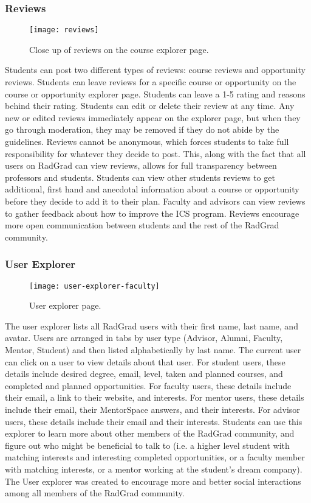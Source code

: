 \subsubsection{Reviews}
\begin{figure}[htbp!]
\centering
\texttt{[image: reviews]}
\caption{Close up of reviews on the course explorer page.}
\end{figure}
Students can post two different types of reviews: course reviews and opportunity reviews. Students can leave reviews for a specific course or opportunity on the course or opportunity explorer page. Students can leave a 1-5 rating and reasons behind their rating. Students can edit or delete their review at any time. Any new or edited reviews immediately appear on the explorer page, but when they go through moderation, they may be removed if they do not abide by the guidelines. Reviews cannot be anonymous, which forces students to take full responsibility for whatever they decide to post. This, along with the fact that all users on RadGrad can view reviews, allows for full transparency between professors and students. Students can view other students reviews to get additional, first hand and anecdotal information about a course or opportunity before they decide to add it to their plan. Faculty and advisors can view reviews to gather feedback about how to improve the ICS program. Reviews encourage more open communication between students and the rest of the RadGrad community.

\subsubsection{User Explorer}
\begin{figure}[htbp!]
\centering
\texttt{[image: user-explorer-faculty]}
\caption{User explorer page.}
\end{figure}

The user explorer lists all RadGrad users with their first name, last name, and avatar. Users are arranged in tabs by user type (Advisor, Alumni, Faculty, Mentor, Student) and then listed alphabetically by last name. The current user can click on a user to view details about that user. For student users, these details include desired degree, email, level, taken and planned courses, and completed and planned opportunities. For faculty users, these details include their email, a link to their website, and interests. For mentor users, these details include their email, their MentorSpace answers, and their interests. For advisor users, these details include their email and their interests. Students can use this explorer to learn more about other members of the RadGrad community, and figure out who might be beneficial to talk to (i.e. a higher level student with matching interests and interesting completed opportunities, or a faculty member with matching interests, or a mentor working at the student's dream company). The User explorer was created to encourage more and better social interactions among all members of the RadGrad community.

